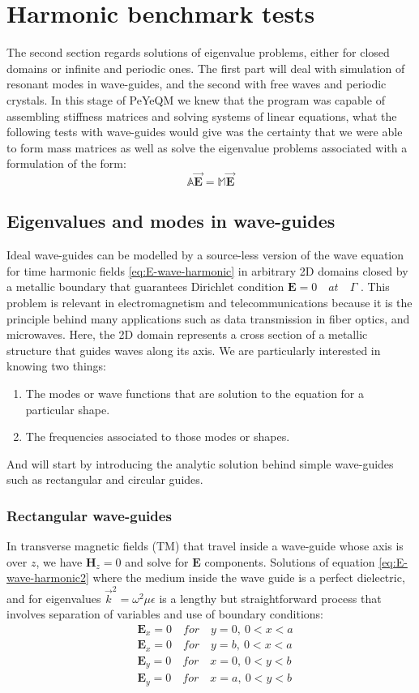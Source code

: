 \section{Harmonic benchmark tests}
The second section regards solutions of eigenvalue problems, either for closed domains or infinite and periodic ones. The first part will deal with simulation of resonant modes in wave-guides, and the second with free waves and periodic crystals.
In this stage of PeYeQM we knew that the program was capable of assembling stiffness matrices and solving systems of linear equations, what the following tests with wave-guides would give was the certainty that we were able to form mass matrices as well  as solve the eigenvalue problems associated with a formulation of the form:
\[\mathbb{A}\mathbf{\vec{E}} = \mathbb{M}\mathbf{\vec{E}}\]


\subsection{Eigenvalues and modes in wave-guides}

Ideal wave-guides can be modelled by a source-less version of the wave equation for time harmonic fields \ref{eq:E-wave-harmonic} in arbitrary 2D domains closed by a metallic boundary that guarantees Dirichlet condition $\mathbf{E} = 0\quad at\quad \Gamma$ . This problem is relevant in electromagnetism and telecommunications because it is the principle behind many applications such as data transmission in fiber optics, and microwaves. Here, the 2D domain represents a cross section of a metallic structure that guides waves along its axis. We are particularly interested in knowing two things:
\begin{enumerate}
\item The modes or wave functions that are solution to the equation for a particular shape.
\item The frequencies associated to those modes or shapes. 
\end{enumerate}
And will start by introducing the analytic solution behind simple wave-guides such as rectangular and circular guides.

\subsubsection{Rectangular wave-guides} 

In transverse magnetic fields (TM) that travel inside a wave-guide whose axis is over $z$, we have $\mathbf{H}_z = 0$ and solve for $\mathbf{E}$ components. 
Solutions of equation \ref{eq:E-wave-harmonic2} where the medium inside the wave guide is a perfect dielectric, and  for eigenvalues $\vec{k}^2 = \omega^2\mu\epsilon$ is a lengthy but straightforward process that involves separation of variables and use of boundary conditions:
\begin{align}
&\mathbf{E}_x = 0 \quad for \quad y=0,\ 0<x<a\\
&\mathbf{E}_x = 0 \quad for \quad y=b,\ 0<x<a\\
&\mathbf{E}_y = 0 \quad for \quad x=0,\ 0<y<b\\
&\mathbf{E}_y = 0 \quad for \quad x=a,\ 0<y<b
\label{eq:square_bc}
\end{align}

